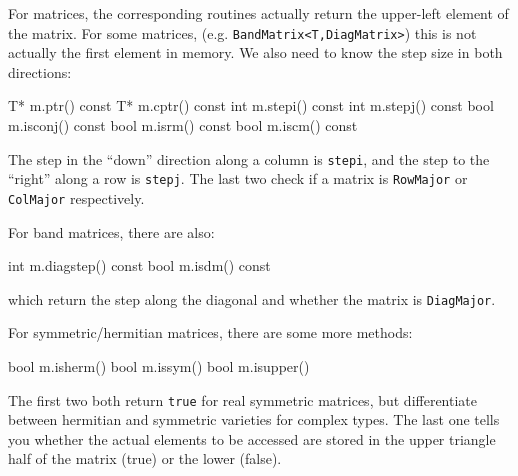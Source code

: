 \documentclass[twoside,letterpaper,11pt]{article}
\renewcommand{\tt}[1]{{\lstinline {#1}}}
\begin{document}
For matrices, the corresponding routines actually return the upper-left element
of the matrix.  For some matrices, (e.g. \tt{BandMatrix<T,DiagMatrix>}) 
this is not actually the first element in memory.  We also need to know the 
step size in both directions:
\begin{tmvcode}
T* m.ptr()
const T* m.cptr() const
int m.stepi() const
int m.stepj() const
bool m.isconj() const
bool m.isrm() const
bool m.iscm() const
\end{tmvcode}
The step in the ``down'' direction along a column is \tt{stepi}, and the step to 
the ``right'' along a row is \tt{stepj}.
The last two check if a matrix is \tt{RowMajor} or \tt{ColMajor} respectively.

For band matrices, there are also:
\begin{tmvcode}
int m.diagstep() const
bool m.isdm() const
\end{tmvcode}
which return the step along the diagonal and whether the matrix is \tt{DiagMajor}.

For symmetric/hermitian matrices, there are some more methods:
\begin{tmvcode}
bool m.isherm()
bool m.issym()
bool m.isupper()
\end{tmvcode}
The first two both return \tt{true} for real symmetric matrices, but 
differentiate between hermitian and symmetric varieties for complex types.
The last one tells you whether the actual elements to be accessed are stored
in the upper triangle half of the matrix (true) or the lower (false).
\end{document}
